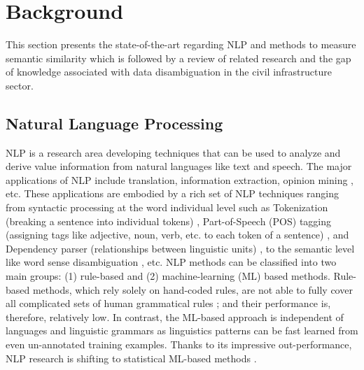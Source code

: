 \documentclass[Journal,InsideFigs, DoubleSpace]{ascelike} %
\begin{document}
\section{Background} \label{sec:litrev} %
This section presents the state-of-the-art regarding NLP and methods to measure semantic similarity which is followed by a review of related research and the gap of knowledge associated with data disambiguation in the civil infrastructure sector.
%
\subsection{Natural Language Processing}
NLP is a research area developing techniques that can be used to analyze and derive value information from natural languages like text and speech. The major applications of NLP include translation, information extraction, opinion mining \cite{Cambria14}, etc. These applications are embodied by a rich set of NLP techniques ranging from syntactic  processing at the word individual level such as Tokenization (breaking a sentence into individual tokens) \cite{Webster92,Zhao11},  Part-of-Speech (POS) tagging (assigning tags like adjective, noun, verb, etc. to each token of a sentence) \cite{Toutanova03,Cunningham02}, and Dependency parser (relationships between linguistic units) \cite{chen14},  to the semantic level like word sense disambiguation \cite{Lesk86,Yarowsky95,Navigli09}, etc. NLP methods can be classified into two main groups: (1) rule-based and (2) machine-learning (ML) based methods. Rule-based methods, which rely solely on hand-coded rules, are not able to fully cover all complicated sets of human grammatical rules \cite{Marcus95}; and their performance is, therefore, relatively low. In contrast, the ML-based approach is independent of languages and linguistic grammars \cite{costa-jussa12} as linguistics patterns can be fast learned from even un-annotated training examples. Thanks to its impressive out-performance, NLP research is shifting to statistical ML-based methods \cite{Cambria14}. 
%
\end{document}
